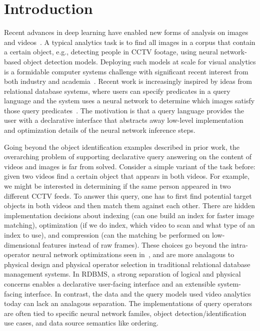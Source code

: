 \section{Introduction}\label{intro}\sloppy
Recent advances in deep learning have enabled new forms of analysis on images and videos~\cite{lecun2015deep}. 
A typical analytics task is to find all images in a corpus that contain a certain object, e.g., detecting people in CCTV footage, using neural network-based object detection models.  
Deploying such models at scale for visual analytics is a formidable computer systems challenge with significant recent interest from both industry and academia~\cite{kang2017noscope, anderson2018predicate, kang2018blazeit, chetlur2014cudnn}. 
Recent work is increasingly inspired by ideas from relational database systems, where users can specify predicates in a query language and the system uses a neural network to determine which images satisfy those query predicates~\cite{kang2018blazeit,wu2018querying}.
The motivation is that a query language provides the user with a declarative interface that abstracts away low-level implementation and optimization details of the neural network inference steps.

Going beyond the object identification examples described in prior work, the overarching problem of supporting declarative query answering on the content of videos and images is far from solved. 
Consider a simple variant of the task before: given two videos find a certain object that appears in both videos. For example, we might be interested in determining if the same person appeared in two different CCTV feeds. To answer this query, one has to first find potential target objects in both videos and then match them against each other. There are hidden implementation decisions about indexing (can one build an index for faster image matching), optimization (if we do index, which video to scan and what type of an index to use), and compression (can the matching be performed on low-dimensional features instead of raw frames). These choices go beyond the intra-operator neural network optimizations seen in~\cite{kang2017noscope, anderson2018predicate, kang2018blazeit}, and are more analagous to physical design and physical operator selection in traditional relational database management systems. In RDBMS, a strong separation of logical and physical concerns enables a declarative user-facing interface and an extensible system-facing interface. In contrast, the data and the query models used video analytics today can lack an analagous separation. The implementations of query operators are often tied to specific neural network familes, object detection/identification use cases, and data source semantics like ordering.

